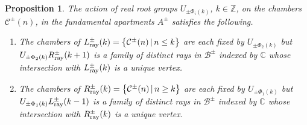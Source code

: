 \documentclass[pdftex]{sigma}
\numberwithin{equation}{section}
\newtheorem{Proposition}[Theorem]{Proposition}
 { \theoremstyle{definition}
\newtheorem{Definition}[Theorem]{Definition}
\newtheorem{Remark}[Theorem]{Remark} }
\def\C{{\mathbb C}}
\def\Z{\mathbb{Z}}
\def\roots{{\Phi}}
\def\cB{\mathcal B}
\def\cC{\mathcal C}
\begin{document}
\begin{Proposition}\label{prop:root_group_actions_on_Fund_Apt}
The action of real root groups $U_{\pm\roots_i(k)}$, $k\in\Z$, on the chambers $\cC^\pm(n)$, in the fundamental apartments
$A^\pm$ satisfies the following.
\begin{enumerate}\itemsep=0pt
\item[$1.$] The chambers of $L^\pm_{\rm ray}(k) = \big\{\cC^\pm(n)\, |\, n\leq k\big\}$ are each fixed by $U_{\pm\roots_2(k)}$ but $U_{\pm\roots_2(k)} R^\pm_{\rm ray}(k+1)$ is a family of distinct rays in $\cB^\pm$ indexed by $\C$ whose intersection with $L^\pm_{\rm ray}(k)$ is a unique vertex.
\item[$2.$] The chambers of $R^\pm_{\rm ray}(k) = \big\{\cC^\pm(n)\, |\, n\geq k\big\}$ are each fixed by $U_{\pm\roots_1(k)}$ but $U_{\pm\roots_1(k)} L^\pm_{\rm ray}(k-1)$ is a family of distinct rays in $\cB^\pm$ indexed by $\C$ whose intersection with $R^\pm_{\rm ray}(k)$ is a unique vertex.
\end{enumerate}
\end{Proposition}
\end{document}

